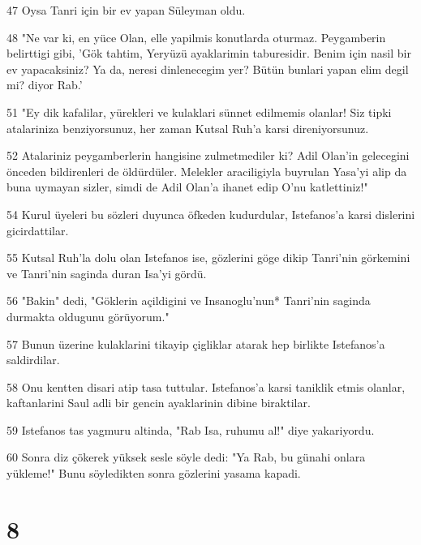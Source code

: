 \par 47 Oysa Tanri için bir ev yapan Süleyman oldu.
\par 48 "Ne var ki, en yüce Olan, elle yapilmis konutlarda oturmaz. Peygamberin belirttigi gibi, 'Gök tahtim, Yeryüzü ayaklarimin taburesidir. Benim için nasil bir ev yapacaksiniz? Ya da, neresi dinlenecegim yer? Bütün bunlari yapan elim degil mi? diyor Rab.'
\par 51 "Ey dik kafalilar, yürekleri ve kulaklari sünnet edilmemis olanlar! Siz tipki atalariniza benziyorsunuz, her zaman Kutsal Ruh'a karsi direniyorsunuz.
\par 52 Atalariniz peygamberlerin hangisine zulmetmediler ki? Adil Olan'in gelecegini önceden bildirenleri de öldürdüler. Melekler araciligiyla buyrulan Yasa'yi alip da buna uymayan sizler, simdi de Adil Olan'a ihanet edip O'nu katlettiniz!"
\par 54 Kurul üyeleri bu sözleri duyunca öfkeden kudurdular, Istefanos'a karsi dislerini gicirdattilar.
\par 55 Kutsal Ruh'la dolu olan Istefanos ise, gözlerini göge dikip Tanri'nin görkemini ve Tanri'nin saginda duran Isa'yi gördü.
\par 56 "Bakin" dedi, "Göklerin açildigini ve Insanoglu'nun* Tanri'nin saginda durmakta oldugunu görüyorum."
\par 57 Bunun üzerine kulaklarini tikayip çigliklar atarak hep birlikte Istefanos'a saldirdilar.
\par 58 Onu kentten disari atip tasa tuttular. Istefanos'a karsi taniklik etmis olanlar, kaftanlarini Saul adli bir gencin ayaklarinin dibine biraktilar.
\par 59 Istefanos tas yagmuru altinda, "Rab Isa, ruhumu al!" diye yakariyordu.
\par 60 Sonra diz çökerek yüksek sesle söyle dedi: "Ya Rab, bu günahi onlara yükleme!" Bunu söyledikten sonra gözlerini yasama kapadi.

\chapter{8}


